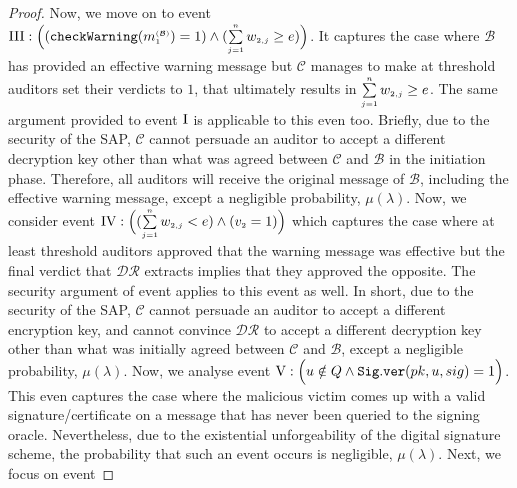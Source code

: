 \begin{proof}
 
 Now, we move on to event   $\text{\MakeUppercase{\romannumeral 3}}: \Big((\mathtt{checkWarning}(m^{\st\mathcal{(B)}}_{\st1})= 1) \wedge (\sum\limits_{\st j=1}^{\st n}w_{\st 2,j}\geq {e})\Big)$. It captures the case where $\mathcal{B}$ has provided an effective warning message but $\mathcal{C}$ manages to make at threshold auditors  set their verdicts to $1$, that ultimately results in $\sum\limits_{\scriptscriptstyle j=1}^{\scriptscriptstyle n}w_{\scriptscriptstyle 2,j}\geq e$. The same argument provided to event $\text{\MakeUppercase{\romannumeral 1}}$ is applicable to this even too. Briefly, due to the security of the SAP, $\mathcal{C}$ cannot persuade an auditor to accept a different decryption key other than what was agreed between $\mathcal{C}$ and $\mathcal{B}$ in the initiation phase. Therefore, all auditors will receive the original message of $\mathcal{B}$, including the effective warning message, except a negligible probability, $\mu(\lambda)$. Now, we consider  event $\text{\MakeUppercase{\romannumeral 4}}:  \Big((\sum\limits_{\st j=1}^{\st n}w_{\st 2,j}< {e}) \wedge ({v}_{\st 2}=1)\Big)$ which captures the case where at least threshold auditors  approved that the warning message was effective but   the final verdict that $\mathcal{DR}$ extracts implies that they approved the opposite. The security argument of  event  applies to this event as well. In short, due to the security of the SAP, $\mathcal{C}$ cannot persuade  an auditor to accept a different encryption key, and cannot convince $\mathcal{DR}$ to accept a different decryption key other than what was initially agreed between $\mathcal{C}$ and $\mathcal{B}$, except a negligible probability, $\mu(\lambda)$. 
  Now, we analyse event  $\text{\MakeUppercase{\romannumeral 5}}: \Big(u\notin Q \wedge\mathtt{Sig.ver}( pk, u, sig) =1\Big)$. This even captures the case where the malicious victim comes up with a valid signature/certificate on a message that has never been queried to the signing oracle.  Nevertheless, due to the existential unforgeability of the digital signature scheme, the probability that such an event occurs is negligible, $\mu(\lambda)$. Next, we focus on event

\end{proof}
